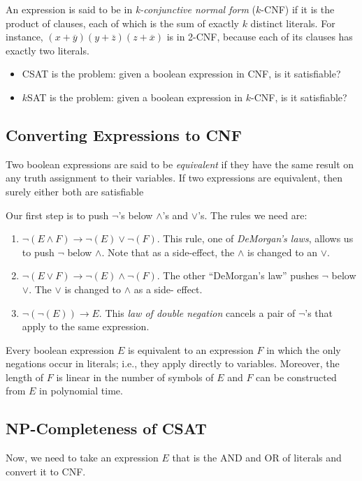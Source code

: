 \documentclass[]{article}
\begin{document}
An expression is said to be in \emph{k-conjunctive normal form} ($k$-CNF) if it
is the product of clauses, each of which is the sum of exactly $k$ distinct
literals. For instance, $(x+\overline{y})(y+\overline{z})(z+\overline{x})$ is in
2-CNF, because each of its clauses has exactly two literals.

\begin{itemize}
\item CSAT is the problem: given a boolean expression in CNF, is it satisfiable?
\item $k$SAT is the problem: given a boolean expression in $k$-CNF, is it
satisfiable?
\end{itemize}

\subsection*{Converting Expressions to CNF}
Two boolean expressions are said to be \emph{equivalent} if they have the same
result on any truth assignment to their variables. If two expressions are
equivalent, then surely either both are satisfiable

Our first step is to push $\neg$'s below $\wedge$'s and $\vee$'s. The rules we
need are:
\begin{enumerate}
\item $\neg(E\wedge F)\rightarrow \neg(E)\vee \neg(F)$. This rule, one of
\emph{DeMorgan's laws}, allows us to push $\neg$ below $\wedge$. Note that as a
side-effect, the $\wedge$ is changed to an $\vee$.
\item $\neg(E\vee F) \rightarrow \neg(E) \wedge \neg(F)$. The other ``DeMorgan's
law'' pushes $\neg$ below $\vee$. The $\vee$ is changed to $\wedge$ as a side-
effect.
\item $\neg(\neg(E)) \rightarrow E$. This \emph{law of double negation} cancels
a pair of $\neg$'s that apply to the same expression.
\end{enumerate}

\begin{thm}
Every boolean expression $E$ is equivalent to an expression $F$ in which the
only negations occur in literals; i.e., they apply directly to variables.
Moreover, the length of $F$ is linear in the number of symbols of $E$ and $F$
can be constructed from $E$ in polynomial time.
\end{thm}

\subsection*{NP-Completeness of CSAT}
Now, we need to take an expression $E$ that is the AND and OR of literals and
convert it to CNF.
\end{document}
